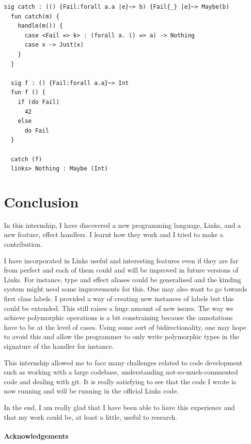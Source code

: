\documentclass[11pt, nonacm=true, language=french, language=english]{acmart}
\begin{document}
\begin{lstlisting}[caption=Polymorphism example]
  sig catch : (() {Fail:forall a.a |e}~> b) {Fail{_} |e}~> Maybe(b)
  fun catch(m) {
    handle(m()) {
      case <Fail => k> : (forall a. () => a) -> Nothing
      case x -> Just(x)
    }
  }

  sig f : () {Fail:forall a.a}~> Int
  fun f () {
    if (do Fail)
      42
    else
      do Fail
  }

  catch (f)
  links> Nothing : Maybe (Int)
\end{lstlisting}



\section{Conclusion}
\label{sec:conclusion}

In this internship, I have discovered a new programming language, Links, and a new feature, effect handlers. I learnt how they work and I tried to make a contribution.

I have incorporated in Links useful and interesting features even if they are far from perfect and each of them could and will be improved in future versions of Links. For instance, type and effect aliases could be generalised and the kinding system might need some improvements for this. One may also want to go towards first class labels. I provided a way of creating new instances of labels but this could be extended. This still raises a huge amount of new issues. The way we achieve polymorphic operations is a bit constraining because the annotations have to be at the level of cases. Using some sort of bidirectionality, one may hope to avoid this and allow the programmer to only write polymorphic types in the signature of the handler for instance.

This internship allowed me to face many challenges related to code development such as working with a large codebase, understanding not-so-much-commented code and dealing with git. It is really satisfying to see that the code I wrote is now running and will be running in the official Links code.

In the end, I am really glad that I have been able to have this experience and that my work could be, at least a little, useful to research.

\paragraph{Acknowledgements}
\label{sec:acknowledgement}
\end{document}

